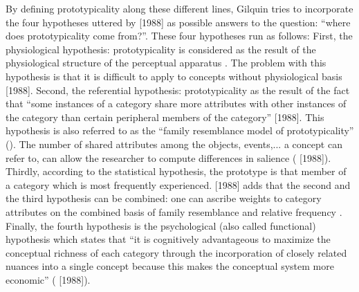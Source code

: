 By defining prototypicality along these different lines, Gilquin tries to incorporate the four hypotheses uttered by \citet{geeraerts_where_2006}  [1988] as possible answers to the question: “where does prototypicality come from?”. These four hypotheses run as follows: First, the physiological hypothesis: prototypicality is considered as the result of the physiological structure of the perceptual apparatus \citep{moore_internal_1973}. The problem with this hypothesis is that it is difficult to apply to concepts without physiological basis \citet[28]{geeraerts_where_2006} [1988]. Second, the referential hypothesis: prototypicality as the result of the fact that “some instances of a category share more attributes with other instances of the category than certain peripheral members of the category” \citet[28]{geeraerts_where_2006} [1988]. This hypothesis is also referred to as the “family resemblance model of prototypicality” (\citealt{rosch_family_1975}). The number of shared attributes among the objects, events,... a concept can refer to, can allow the researcher to compute differences in salience (\citealt[29]{geeraerts_where_2006} [1988]). Thirdly, according to the statistical hypothesis, the prototype is that member of a category which is most frequently experienced. \citet[29]{geeraerts_where_2006} [1988] adds that the second and the third hypothesis can be combined: one can ascribe weights to category attributes on the combined basis of family resemblance and relative frequency \citep{rosch_cognitive_1975}. Finally, the fourth hypothesis is the psychological (also called functional) hypothesis which states that “it is cognitively advantageous to maximize the conceptual richness of each category through the incorporation of closely related nuances into a single concept because this makes the conceptual system more economic” (\citealt[28]{geeraerts_where_2006} [1988]).



